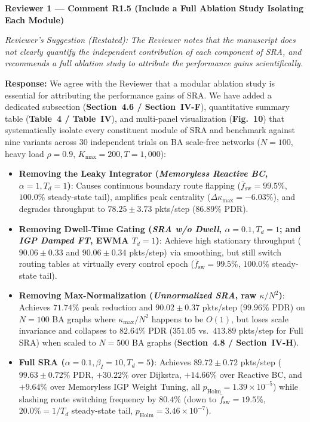 \documentclass[11pt,a4paper]{article}
\newcommand{\cbox}[2]{%
  \vspace{0.6em}\noindent\textbf{#1}\par\smallskip
  \noindent\textit{Reviewer's Suggestion (Restated):} \textit{#2}\par\smallskip
}
\begin{document}
\hrulefill

\cbox{Reviewer 1 --- Comment R1.5 (Include a Full Ablation Study Isolating Each Module)}{The Reviewer notes that the manuscript does not clearly quantify the independent contribution of each component of SRA, and recommends a full ablation study to attribute the performance gains scientifically.}

\noindent\textbf{Response:} We agree with the Reviewer that a modular ablation study is essential for attributing the performance gains of SRA. We have added a dedicated subsection (\textbf{Section~4.6 / Section~IV-F}), quantitative summary table (\textbf{Table~4 / Table~IV}), and multi-panel visualization (\textbf{Fig.~10}) that systematically isolate every constituent module of SRA and benchmark against nine variants across 30 independent trials on BA scale-free networks ($N=100$, heavy load $\rho=0.9$, $K_{\max}=200, T=1{,}000$):
\begin{itemize}[leftmargin=1.8em]
    \item \textbf{Removing the Leaky Integrator (\textit{Memoryless Reactive BC}, $\alpha=1, T_d=1$)}: Causes continuous boundary route flapping ($\bar{f}_{\text{sw}} = 99.5\%$, $100.0\%$ steady-state tail), amplifies peak centrality ($\Delta\kappa_{\max} = -6.03\%$), and degrades throughput to $78.25 \pm 3.73$ pkts/step ($86.89\%$ PDR).
    \item \textbf{Removing Dwell-Time Gating (\textit{SRA w/o Dwell}, $\alpha=0.1, T_d=1$; and \textit{IGP Damped FT}, EWMA $T_d=1$)}: Achieve high stationary throughput ($90.06 \pm 0.33$ and $90.06 \pm 0.34$ pkts/step) via smoothing, but still switch routing tables at virtually every control epoch ($\bar{f}_{\text{sw}} = 99.5\%$, $100.0\%$ steady-state tail).
    \item \textbf{Removing Max-Normalization (\textit{Unnormalized SRA}, raw $\kappa/N^2$)}: Achieves $71.74\%$ peak reduction and $90.02 \pm 0.37$ pkts/step ($99.96\%$ PDR) on $N=100$ BA graphs where $\kappa_{\max}/N^2$ happens to be $O(1)$, but loses scale invariance and collapses to $82.64\%$ PDR ($351.05$ vs.\ $413.89$ pkts/step for Full SRA) when scaled to $N=500$ BA graphs (\textbf{Section~4.8 / Section~IV-H}).
    \item \textbf{Full SRA ($\alpha=0.1, \beta_I=10, T_d=5$)}: Achieves $89.72 \pm 0.72$ pkts/step ($99.63 \pm 0.72\%$ PDR, $+30.22\%$ over Dijkstra, $+14.66\%$ over Reactive BC, and $+9.64\%$ over Memoryless IGP Weight Tuning, all $p_{\text{Holm}}=1.39 \times 10^{-5}$) while slashing route switching frequency by \textbf{$80.4\%$} (down to $\bar{f}_{\text{sw}} = 19.5\%$, $20.0\% = 1/T_d$ steady-state tail, $p_{\text{Holm}}=3.46 \times 10^{-7}$).
\end{itemize}
\end{document}
